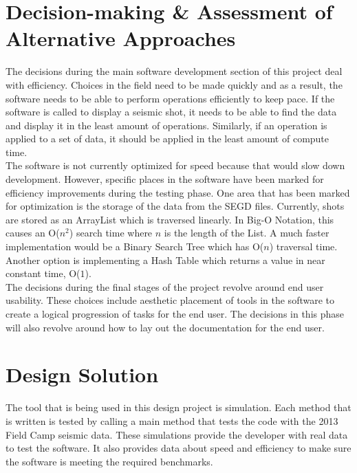 \documentclass[12pt]{article}
\begin{document}
\section{Decision-making \& Assessment of Alternative Approaches}

The decisions during the main software development section of this project deal with efficiency. Choices in the field need to be made quickly and as a result, the software needs to be able to perform operations efficiently to keep pace. If the software is called to display a seismic shot, it needs to be able to find the data and display it in the least amount of operations. Similarly, if an operation is applied to a set of data, it should be applied in the least amount of compute time. \\

The software is not currently optimized for speed because that would slow down development. However, specific places in the software have been marked for efficiency improvements during the testing phase. One area that has been marked for optimization is the storage of the data from the SEGD files. Currently, shots are stored as an ArrayList which is traversed linearly. In Big-O Notation, this causes an O($n^2$) search time where $n$ is the length of the List. A much faster implementation would be a Binary Search Tree which has O($n$) traversal time. Another option is implementing a Hash Table which returns a value in near constant time, O($1$). \\

The decisions during the final stages of the project revolve around end user usability. These choices include aesthetic placement of tools in the software to create a logical progression of tasks for the end user. The decisions in this phase will also revolve around how to lay out the documentation for the end user.

\section{Design Solution}

The tool that is being used in this design project is simulation. Each method that is written is tested by calling a main method that tests the code with the 2013 Field Camp seismic data. These simulations provide the developer with real data to test the software. It also provides data about speed and efficiency to make sure the software is meeting the required benchmarks. \\
\end{document}
